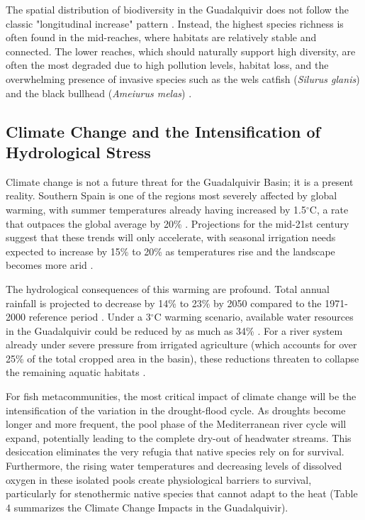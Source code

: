 \documentclass[11pt,a4paper]{article}
\begin{document}
The spatial distribution of biodiversity in the Guadalquivir does not follow the classic "longitudinal increase" pattern \cite{Herrera2022}. Instead, the highest species richness is often found in the mid-reaches, where habitats are relatively stable and connected. The lower reaches, which should naturally support high diversity, are often the most degraded due to high pollution levels, habitat loss, and the overwhelming presence of invasive species such as the wels catfish (\textit{Silurus glanis}) and the black bullhead (\textit{Ameiurus melas}) \cite{Herrera2022}.

\subsection{Climate Change and the Intensification of Hydrological Stress}
Climate change is not a future threat for the Guadalquivir Basin; it is a present reality. Southern Spain is one of the regions most severely affected by global warming, with summer temperatures already having increased by 1.5$^\circ$C, a rate that outpaces the global average by 20\% \cite{Berbeletal2011,doi:10.1080/07900627.2012.640875}. Projections for the mid-21st century suggest that these trends will only accelerate, with seasonal irrigation needs expected to increase by 15\% to 20\% as temperatures rise and the landscape becomes more arid \cite{Berbeletal2011,doi:10.1080/07900627.2012.640875}.

The hydrological consequences of this warming are profound. Total annual rainfall is projected to decrease by 14\% to 23\% by 2050 compared to the 1971-2000 reference period \cite{w17213052}. Under a 3$^\circ$C warming scenario, available water resources in the Guadalquivir could be reduced by as much as 34\% \cite{Pelletieretal2009}. For a river system already under severe pressure from irrigated agriculture (which accounts for over 25\% of the total cropped area in the basin), these reductions threaten to collapse the remaining aquatic habitats \cite{Pelletieretal2009}.

For fish metacommunities, the most critical impact of climate change will be the intensification of the variation in the drought-flood cycle. As droughts become longer and more frequent, the pool phase of the Mediterranean river cycle will expand, potentially leading to the complete dry-out of headwater streams. This desiccation eliminates the very refugia that native species rely on for survival. Furthermore, the rising water temperatures and decreasing levels of dissolved oxygen in these isolated pools create physiological barriers to survival, particularly for stenothermic native species that cannot adapt to the heat (Table 4 summarizes the Climate Change Impacts in the Guadalquivir).
\end{document}
